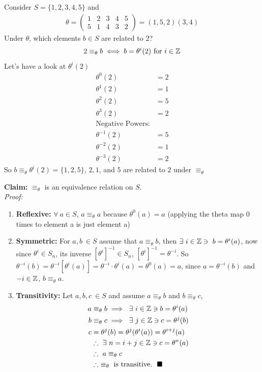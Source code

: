 \begin{example}
Consider $S=\{1,2,3,4,5\}$ and
\begin{align}
    \theta = \begin{pmatrix}
    1&2&3&4&5 \\ 5&1&4&3&2
    \end{pmatrix} = (1,5,2)(3,4)\nonumber
\end{align}
Under $\theta$, which elements $b\in S$ are related to $2$?
\begin{align}
    2\equiv_{\theta} b \iff b=\theta^i(2) \ \text{for } i \in {\mathbb{Z}} \nonumber
\end{align}
Let's have a look at $\theta^i(2)$
\begin{align}
    \theta^0(2)&=2 \nonumber \\
    \theta^1(2)&=1 \nonumber \\
    \theta^2(2)&=5 \nonumber \\
    \theta^3(2)&=2 \nonumber \\
    \text{Negative Powers:} \nonumber \\
    \theta^{-1}(2)&=5 \nonumber \\
    \theta^{-2}(2)&=1 \nonumber \\
    \theta^{-3}(2)&=2 \nonumber
\end{align}
So $b\equiv_{\theta}\theta^i(2)= \{1,2,5\}$, $2, 1$, and $5$ are related to $2$ under
$\equiv_{\theta}$
\end{example}
\textbf{Claim:} $\equiv_{\theta}$ is an equivalence relation on $S$. \\
\textit{Proof:}
\begin{enumerate}
    \item \textbf{Reflexive:} $\forall \ a \in S$, $a\equiv_{\theta} a $ because $\theta^0(a)=a$
    (applying the theta map 0 times to element a is just element a)
    \item \textbf{Symmetric:} For $a,b \ \in S$ assume that $a\equiv_{\theta} b$, then
    $\exists \ i \in \Z \ni \ b=\theta^i(a)$, now since $\theta^i \in S_n$, its inverse
    $[\theta^i]^{-1}\in S_n$, $[\theta^i]^{-1}=\theta^{-i}$. So
    $\theta^{-i}(b)= \theta^{-i}[\theta^i(a)] = \theta^{-i}\cdot \theta^i(a)=\theta^0(a)=a$, since
    $a=\theta^{-i}(b)$ and $-i\in {\mathbb{Z}}$, $b\equiv_{\theta} a$.
    \item \textbf{Transitivity: }Let $a, b, c \ \in S$ and assume $a\equiv_{\theta} b$ and
    $b\equiv_{\theta} c$,
    \begin{align}
        a&\equiv_{\theta} b \implies \  \exists \ i \in \Z \ni b= \theta^i(a)\nonumber \\
        b&\equiv_{\theta} c \implies \  \exists \ j \in \Z \ni c= \theta^j(b)\nonumber \\
        c&= \theta^j(b)=\theta^j(\theta^i(a))=\theta^{i+j}(a) \nonumber \\
        &\therefore \ \exists \  n=i+j \in \Z \ni c=\theta^n(a) \nonumber \\
        &\therefore \ a \equiv_{\theta} c \nonumber \\
        &\therefore \ \equiv_{\theta} \text{ is transitive.} \ \ \blacksquare \nonumber
    \end{align}
\end{enumerate}
